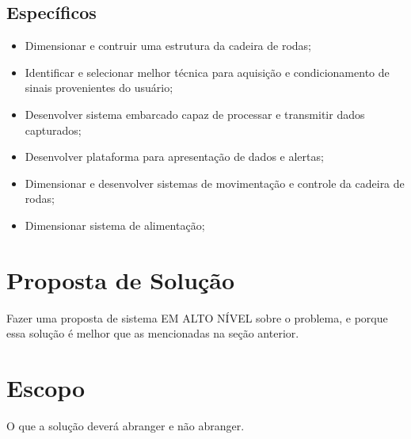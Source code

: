 \subsection{Específicos}

\begin{itemize}
\item Dimensionar e contruir uma estrutura da cadeira de rodas;
\item Identificar e selecionar melhor técnica para aquisição e condicionamento de sinais provenientes do usuário;
\item Desenvolver sistema embarcado capaz de processar e transmitir dados capturados;
\item Desenvolver plataforma para apresentação de dados e alertas;
\item Dimensionar e desenvolver sistemas de movimentação e controle da cadeira de rodas;
\item Dimensionar sistema de alimentação;
\end{itemize}

\section{Proposta de Solução}

Fazer uma proposta de sistema EM ALTO NÍVEL sobre o problema, e porque essa solução é melhor que as mencionadas na seção anterior.

\section{Escopo}

O que a solução deverá abranger e não abranger.




